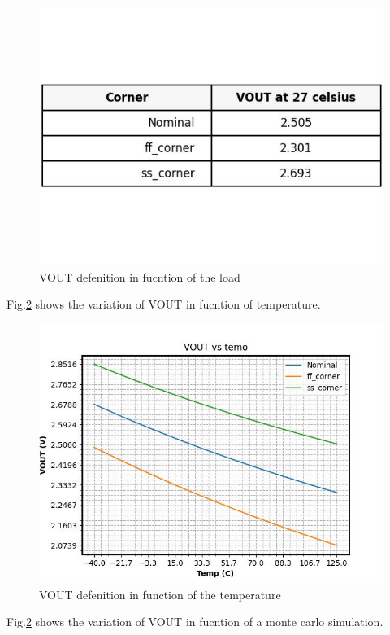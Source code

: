 \documentclass{article}
\begin{document}
\begin{figure}[H] %
    \centering
    \includegraphics[width=.7\textwidth]{./only_PMOS_LOAD_VDC_NMOS_table.jpg} %
    \caption{VOUT defenition in fucntion of the load}
    \label{fig:table_vout}
\end{figure}

Fig.\ref{fig:vout_temp_var}  shows the variation of VOUT in fucntion of temperature.

\begin{figure}[H] %
    \centering
    \includegraphics[width=.7\textwidth]{./only_PMOS_LOAD_VDC_NMOS.jpg} %
    \caption{VOUT defenition in function of the temperature}
    \label{fig:vout_temp_var}
\end{figure}




Fig.\ref{fig:vout_temp_var}  shows the variation of VOUT in fucntion of a monte carlo simulation.
\end{document}
